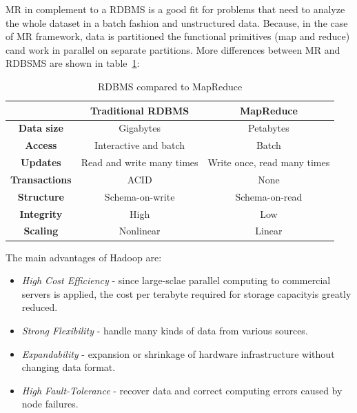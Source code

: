 MR in complement to a RDBMS is a good fit for problems that need to analyze the whole dataset in a batch fashion and unstructured data. Because, in the case of MR framework, data is partitioned the functional primitives (map and reduce) cand work in parallel on separate partitions. More differences between MR and RDBSMS are shown in \mbox {table \ref{table:mrdiff}}:

\begin{table}[!ht]
\begin{center}
\caption{RDBMS compared to MapReduce \cite{tableHadoop}}
\begin{tabular}{| c | c | c |}
\hline
  & \textbf{Traditional RDBMS} & \textbf{MapReduce} \\
\hline
 \textbf{Data size}& Gigabytes & Petabytes \\
\hline
 \textbf{Access}& Interactive and batch & Batch \\
\hline
\textbf{Updates} & Read and write many times & Write once, read many times \\
\hline
\textbf{Transactions} & ACID & None \\
\hline
\textbf{Structure} & Schema-on-write & Schema-on-read \\
\hline
\textbf{Integrity} & High & Low \\
\hline
\textbf{Scaling} & Nonlinear & Linear \\
\hline
\end{tabular}
\label{table:mrdiff}
\vspace{-2.5em}
\end{center}
\end{table}

The main advantages of Hadoop are:
\begin{itemize}

 \item \textit{High Cost Efficiency} - since large-sclae parallel computing to commercial servers is applied, the cost per terabyte required for storage capacityis greatly reduced.

 \item \textit{Strong Flexibility} - handle many kinds of data from various sources.

 \item \textit{Expandability} - expansion or shrinkage of hardware infrastructure without changing data format.

 \item \textit{High Fault-Tolerance} - recover data and correct computing errors caused by node failures.

\end{itemize}

